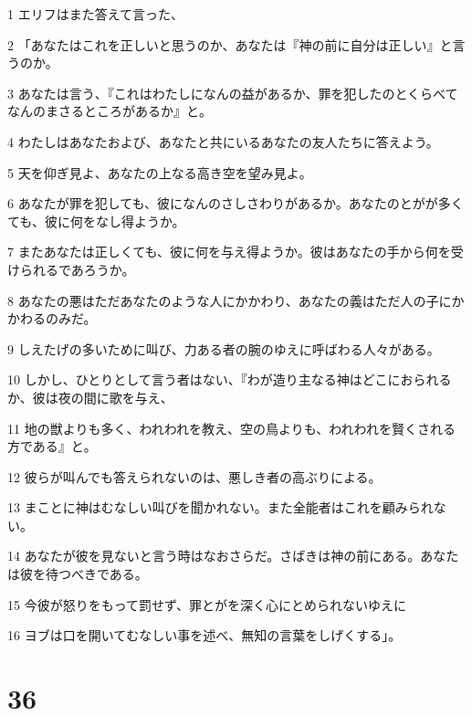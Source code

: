 \par 1 エリフはまた答えて言った、
\par 2 「あなたはこれを正しいと思うのか、あなたは『神の前に自分は正しい』と言うのか。
\par 3 あなたは言う、『これはわたしになんの益があるか、罪を犯したのとくらべてなんのまさるところがあるか』と。
\par 4 わたしはあなたおよび、あなたと共にいるあなたの友人たちに答えよう。
\par 5 天を仰ぎ見よ、あなたの上なる高き空を望み見よ。
\par 6 あなたが罪を犯しても、彼になんのさしさわりがあるか。あなたのとがが多くても、彼に何をなし得ようか。
\par 7 またあなたは正しくても、彼に何を与え得ようか。彼はあなたの手から何を受けられるであろうか。
\par 8 あなたの悪はただあなたのような人にかかわり、あなたの義はただ人の子にかかわるのみだ。
\par 9 しえたげの多いために叫び、力ある者の腕のゆえに呼ばわる人々がある。
\par 10 しかし、ひとりとして言う者はない、『わが造り主なる神はどこにおられるか、彼は夜の間に歌を与え、
\par 11 地の獣よりも多く、われわれを教え、空の鳥よりも、われわれを賢くされる方である』と。
\par 12 彼らが叫んでも答えられないのは、悪しき者の高ぶりによる。
\par 13 まことに神はむなしい叫びを聞かれない。また全能者はこれを顧みられない。
\par 14 あなたが彼を見ないと言う時はなおさらだ。さばきは神の前にある。あなたは彼を待つべきである。
\par 15 今彼が怒りをもって罰せず、罪とがを深く心にとめられないゆえに
\par 16 ヨブは口を開いてむなしい事を述べ、無知の言葉をしげくする」。

\chapter{36}

